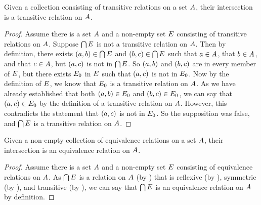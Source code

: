 \documentclass[main.tex]{subfiles}
\begin{document}
\begin{lemma}
	Given a collection consisting of transitive relations on a set
	\({A}\), their intersection is a transitive relation on
	\({A}\).
\end{lemma}
\begin{proof}
	Assume there is a set \({A}\) and a non-empty set \({E}\)
	consisting of transitive relations on \({A}\). Suppose
	\(\bigcap {E}\) is not a transitive relation on
	\({A}\). Then by definition, there exists
	\(({a},{b}) \in \bigcap {E}\) and
	\(({b},{c}) \in \bigcap {E}\) such that
	\(a \in {A}\), that \(b \in {A}\), and that
	\(c \in {A}\), but \(({a},{c})\) is not in
	\(\bigcap {E}\). So \(({a},{b})\) and \(({b},{c})\)
	are in every member of \({E}\), but there exists
	\({E_0}\) in \({E}\) such that \(({a},{c})\) is not
	in \({E_0}\). Now by the definition of \({E}\), we know
	that \({E_0}\) is a transitive relation on \({A}\). As we
	have already established that both
	\(({a},{b}) \in {E_0}\) and
	\(({b},{c}) \in {E_0}\), we can say that
	\(({a},{c}) \in {E_0}\) by the definition of a transitive
	relation on \({A}\). However, this contradicts the statement that
	\(({a},{c})\) is not in \({E_0}\). So the supposition was
	false, and \(\bigcap {E}\) is a transitive relation on
	\({A}\).
\end{proof}

\begin{thm}
	Given a non-empty collection of equivalence relations on a set
	\({A}\), their intersection is an equivalence relation on
	\({A}\).
\end{thm}
\begin{proof}
	Assume there is a set \({A}\) and a non-empty set \({E}\)
	consisting of equivalence relations on \({A}\). As
	\(\bigcap {E}\) is a relation on \({A}\) (by
	) that is reflexive (by
	), symmetric (by
	), and transitive (by
	), we can say that
	\(\bigcap {E}\) is an equivalence relation on \({A}\)
	by definition.
\end{proof}
\end{document}
